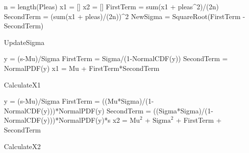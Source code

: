 \documentclass[11pt]{article}
\begin{document}
    \begin{algorithm}[H]
      \SetAlgoLined
      n = length(Pleas)\;
      x1 = []\;
      x2 = []\;
      FirstTerm = sum(x1 + pleas^2)/(2n)\;
      SecondTerm = (sum(x1 + pleas)/(2n))^2\;
      NewSigma = SquareRoot(FirstTerm - SecondTerm)\;

      \caption{UpdateSigma}
      \end{algorithm}

    \begin{algorithm}[H]
      \SetAlgoLined
      y = (s-Mu)/Sigma\;
      FirstTerm = Sigma/(1-NormalCDF(y))\;
      SecondTerm = NormalPDF(y)\;
      x1 = Mu + FirstTerm*SecondTerm\;

      \caption{CalculateX1}
      \end{algorithm}

    \begin{algorithm}[H]
      \SetAlgoLined
      y = (s-Mu)/Sigma\;
      FirstTerm = ((Mu*Sigma)/(1-NormalCDF(y)))*NormalPDF(y)\;
      SecondTerm = ((Sigma*Sigma)/(1-NormalCDF(y)))*NormalPDF(y)*s\;
      x2 = $\text{Mu}^2$ + $\text{Sigma}^2$ + FirstTerm + SecondTerm\;
      \caption{CalculateX2}
      \end{algorithm}
\end{document}
